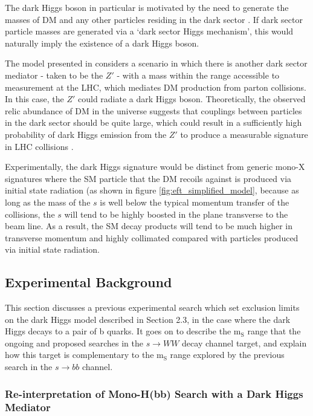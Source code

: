 \documentclass[12pt]{article}
\begin{document}
The dark Higgs boson in particular is motivated by the need to generate the masses of DM and any other particles residing in the dark sector \cite{dark_Higgs}. If dark sector particle masses are generated via a `dark sector Higgs mechanism', this would naturally imply the existence of a dark Higgs boson. 

The model presented in \cite{dark_Higgs} considers a scenario in which there is another dark sector mediator - taken to be the $Z'$ - with a mass within the range accessible to measurement at the LHC, which mediates DM production from parton collisions. In this case, the $Z'$ could radiate a dark Higgs boson. Theoretically, the observed relic abundance of DM in the universe suggests that couplings between particles in the dark sector should be quite large, which could result in a sufficiently high probability of dark Higgs emission from the $Z'$ to produce a measurable signature in LHC collisions \cite{dark_Higgs}. 

Experimentally, the dark Higgs signature would be distinct from generic mono-X signatures where the SM particle that the DM recoils against is produced via initial state radiation (as shown in figure \ref{fig:eft_simplified_model}, because as long as the mass of the $s$ is well below the typical momentum transfer of the collisions, the $s$ will tend to be highly boosted in the plane transverse to the beam line. As a result, the SM decay products will tend to be much higher in transverse momentum and highly collimated compared with particles produced via initial state radiation.  

\subsection{Experimental Background}

This section discusses a previous experimental search which set exclusion limits on the dark Higgs model described in Section 2.3, in the case where the dark Higgs decays to a pair of b quarks. It goes on to describe the m$_\text{S}$ range that the ongoing and proposed searches in the $s \rightarrow WW$ decay channel target, and explain how this target is complementary to the m$_\text{S}$ range explored by the previous search in the $s \rightarrow bb$ channel. 

\subsubsection{Re-interpretation of Mono-H(bb) Search with a Dark Higgs Mediator}
\end{document}
